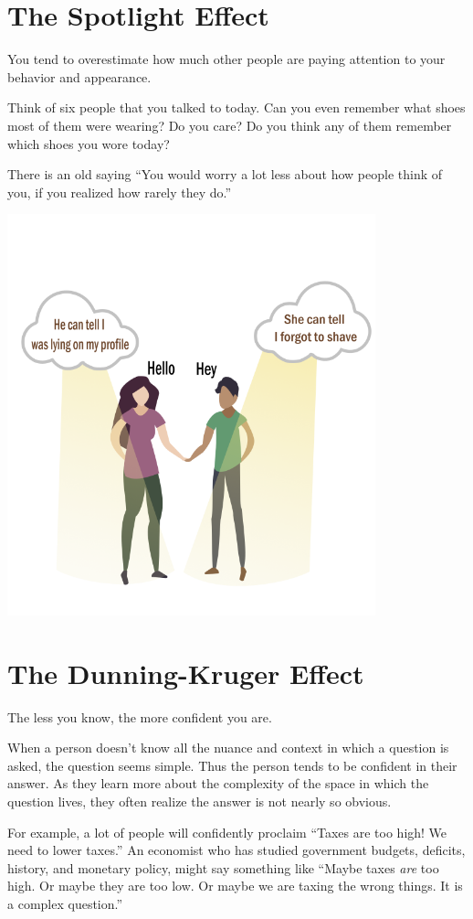 \section{The Spotlight Effect}

You tend to overestimate how much other people are paying attention to
your behavior and appearance.

Think of six people that you talked to today. Can you even remember what
shoes most of them were wearing? Do you care? Do you think any of them
remember which shoes you wore today?

There is an old saying ``You would worry a lot less about how people
think of you, if you realized how rarely they do.''

\includegraphics[width=0.8\textwidth]{bias_SE.png}

\section{The Dunning-Kruger Effect}

The less you know, the more confident you are.

When a person doesn't know all the nuance and context in which a question is
asked, the question seems simple. Thus the person tends to be confident in
their answer. As they learn more about the complexity of the space in
which the question lives, they often realize the answer is not nearly so
obvious.

For example, a lot of people will confidently proclaim ``Taxes are too
high! We need to lower taxes.''  An economist who has studied
government budgets, deficits, history, and monetary policy, might say
something like ``Maybe taxes \emph{are} too high. Or maybe they are
too low. Or maybe we are taxing the wrong things. It is a 
complex question.''

